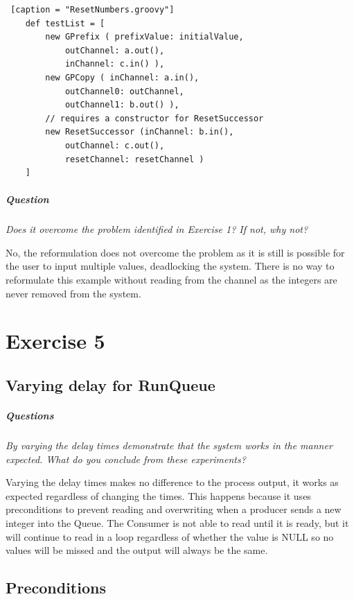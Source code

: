 \documentclass[10pt, a4paper]{article}
\begin{document}
	\begin{lstlisting} [caption = "ResetNumbers.groovy"]
	def testList = [
		new GPrefix ( prefixValue: initialValue, 
			outChannel: a.out(), 
			inChannel: c.in() ),
		new GPCopy ( inChannel: a.in(), 
			outChannel0: outChannel, 
			outChannel1: b.out() ),
		// requires a constructor for ResetSuccessor
		new ResetSuccessor (inChannel: b.in(),
			outChannel: c.out(),
			resetChannel: resetChannel )
	]	\end{lstlisting}
	
	\subparagraph{Question}
	
	\hfill
	
	\textit{Does it overcome the problem identified in Exercise 1? If not, why not?}
	
	No, the reformulation does not overcome the problem as it is still is possible for the user to input multiple values, deadlocking the system. There is no way to reformulate this example without reading from the channel as the integers are never removed from the system.
	
	\setcounter{section}{5}
	\section*{Exercise 5}
	
	\setcounter{subsection}{0}
	\subsection{Varying delay for RunQueue}
	
	\subparagraph{Questions}

	\textit{By varying the delay times demonstrate that the system works in the manner expected. What do you conclude from these experiments?}
	
	Varying the delay times makes no difference to the process output, it works as expected regardless of changing the times. This happens because it uses preconditions to prevent reading and overwriting when a producer sends a new integer into the Queue. The Consumer is not able to read until it is ready, but it will continue to read in a loop regardless of whether the value is NULL so no values will be missed and the output will always be the same. 
	
	
	
	\subsection{Preconditions}
	
\end{document}
